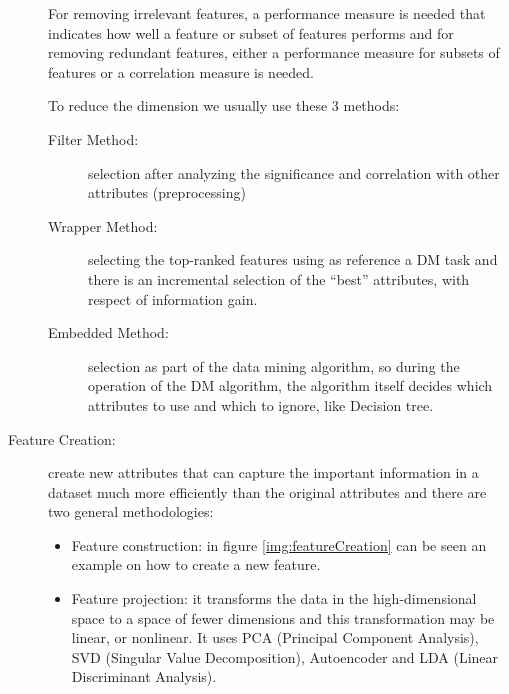 \begin{description}
                                  For removing irrelevant features, a performance measure is needed that
                                  indicates how well a feature or subset of features performs and for removing
                                  redundant features, either a performance measure for subsets of features or a
                                  correlation measure is needed.

                                  To reduce the dimension we usually use these $3$ methods:
                                  \begin{description}
                                      \item [Filter Method: ] selection after analyzing the significance and 
                                                              correlation with other attributes (preprocessing)
                                      \item [Wrapper Method: ] selecting the top-ranked features using 
                                                               as reference a DM task and there is an incremental
                                                               selection of the “best” attributes, with respect
                                                               of information gain.
                                      \item [Embedded Method: ] selection as part of the data mining algorithm,
                                                                so during the operation of the DM algorithm,
                                                                the algorithm itself decides which attributes to use
                                                                and which to ignore, like Decision tree.
                                  \end{description}
    \item [Feature Creation: ] create new attributes that can capture the important information in a dataset
                               much more efficiently than the original attributes and 
                               there are two general methodologies:
                               \begin{itemize}
                                   \item Feature construction: in figure \ref{img:featureCreation} can be seen
                                         an example on how to create a new feature.
                                   \item Feature projection: it transforms the data in the high-dimensional space
                                         to a space of fewer dimensions and this transformation may be linear,
                                         or nonlinear.\newline
					 It uses PCA (Principal Component Analysis), SVD (Singular Value Decomposition),
					 Autoencoder and LDA (Linear Discriminant Analysis).
                               \end{itemize}


\end{description}

